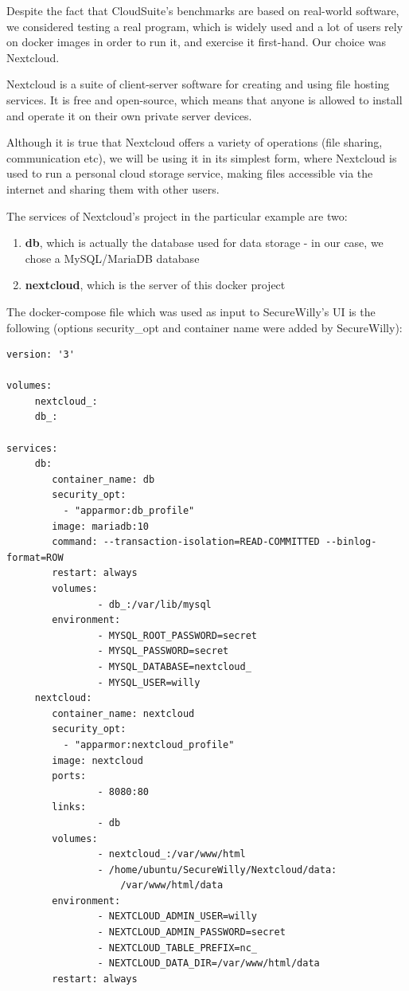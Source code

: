 Despite the fact that CloudSuite's benchmarks are based on real-world software, we considered testing a real program, which is widely used and a lot of users rely on docker images in order to run it, and exercise it first-hand. Our choice was Nextcloud.

Nextcloud is a suite of client-server software for creating and using file hosting services. It is free and open-source, which means that anyone is allowed to install and operate it on their own private server devices. \cite{wikinext}

Although it is true that Nextcloud offers a variety of operations (file sharing, communication etc), we will be using it in its simplest form, where Nextcloud is used to run a personal cloud storage service, making files accessible via the internet and sharing them with other users.

The services of Nextcloud's project in the particular example are two:
\begin{enumerate}
\item \textbf{db}, which is actually the database used for data storage - in our case, we chose a MySQL/MariaDB database
\item \textbf{nextcloud}, which is the server of this docker project
\end{enumerate}

The docker-compose file which was used as input to SecureWilly's UI is the following (options security\_opt and container name were added by SecureWilly):

\begin{lstlisting}[style=Dockerfile, caption={Nextcloud's docker-compose.yml}]
version: '3'

volumes:
     nextcloud_:
     db_:

services:
     db:
        container_name: db
        security_opt:
          - "apparmor:db_profile"
        image: mariadb:10
        command: --transaction-isolation=READ-COMMITTED --binlog-format=ROW
        restart: always
        volumes:
                - db_:/var/lib/mysql
        environment:
                - MYSQL_ROOT_PASSWORD=secret
                - MYSQL_PASSWORD=secret
                - MYSQL_DATABASE=nextcloud_
                - MYSQL_USER=willy
     nextcloud:
        container_name: nextcloud
        security_opt:
          - "apparmor:nextcloud_profile"
        image: nextcloud
        ports:
                - 8080:80
        links:
                - db
        volumes:
                - nextcloud_:/var/www/html
                - /home/ubuntu/SecureWilly/Nextcloud/data:
					/var/www/html/data
        environment:
                - NEXTCLOUD_ADMIN_USER=willy
                - NEXTCLOUD_ADMIN_PASSWORD=secret
                - NEXTCLOUD_TABLE_PREFIX=nc_
                - NEXTCLOUD_DATA_DIR=/var/www/html/data
        restart: always
\end{lstlisting}

